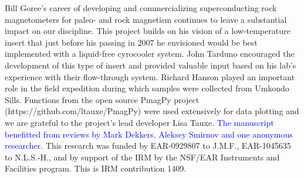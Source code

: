 \documentclass[draft,gc]{AGUTeX}
\begin{document}
\begin{article}
%
%
%
%
%
%
%

\begin{acknowledgments}

Bill Goree's career of developing and commercializing superconducting rock magnetometers for paleo- and rock magnetism continues to leave a substantial impact on our discipline. This project builds on his vision of a low-temperature insert that just before his passing in 2007 he envisioned would be best implemented with a liquid-free cyrocooler system. John Tarduno encouraged the development of this type of insert and provided valuable input based on his lab's experience with their flow-through system. Richard Hanson played an important role in the field expedition during which samples were collected from Umkondo Sills. Functions from the open source PmagPy project (https://github.com/ltauxe/PmagPy) were used extensively for data plotting and we are grateful to the project's lead developer Lisa Tauxe. \textcolor{blue}{The manuscript benefitted from reviews by Mark Dekkers, Aleksey Smirnov and one anonymous researcher.} This research was funded by EAR-0929807 to J.M.F., EAR-1045635 to N.L.S.-H., and by support of the IRM by the NSF/EAR Instruments and Facilities program. This is IRM contribution 1409.


\end{acknowledgments}
\end{article}
\end{document}
